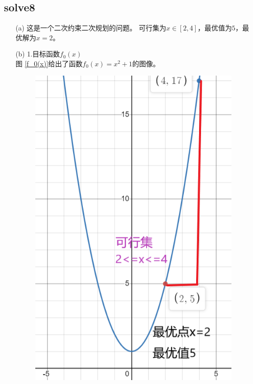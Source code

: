 \documentclass[12pt,a4paper]{ctexart}
\begin{document}
\subsection*{solve8}
\begin{itemize}
    \item[(a)] 这是一个二次约束二次规划的问题。
    可行集为$x \in [2,4]$，最优值为$5$，最优解为$x=2$。
    \item[(b)]
    1.目标函数$f_0(x)$\\
    图 \ref{f_0(x)}给出了函数$f_0(x)=x^2+1$的图像。\\
    \begin{figure}[!h] %
        \centering %
        \includegraphics[scale=0.5]{image/f_0(x).png} %

\end{figure}
\end{itemize}
\end{document}
